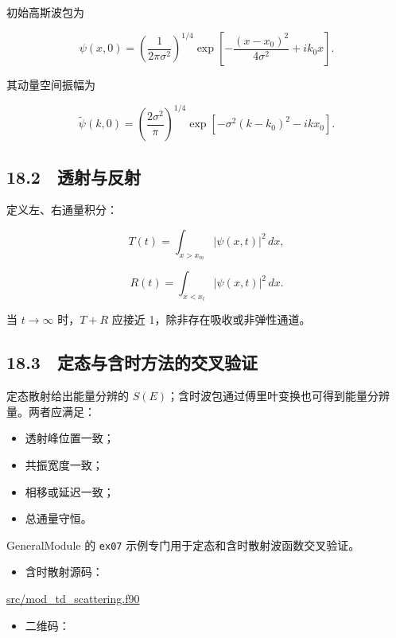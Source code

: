 \documentclass[
  a4paper,
]{ctexbook}
\providecommand{\tightlist}{%
  \setlength{\itemsep}{0pt}\setlength{\parskip}{0pt}}
\begin{document}
初始高斯波包为

\[
\psi(x,0)
=
\left(\frac{1}{2\pi\sigma^2}\right)^{1/4}
\exp\left[
-\frac{(x-x_0)^2}{4\sigma^2}
+ik_0x
\right].
\]

其动量空间振幅为

\[
\tilde\psi(k,0)
=
\left(\frac{2\sigma^2}{\pi}\right)^{1/4}
\exp\left[
-\sigma^2(k-k_0)^2
-ikx_0
\right].
\]

\hypertarget{ux900fux5c04ux4e0eux53cdux5c04}{%
\subsection{18.2　透射与反射}\label{ux900fux5c04ux4e0eux53cdux5c04}}

定义左、右通量积分：

\[
T(t)
=
\int_{x>x_m}|\psi(x,t)|^2\,dx,
\]

\[
R(t)
=
\int_{x<x_l}|\psi(x,t)|^2\,dx.
\]

当 \(t\rightarrow\infty\) 时，\(T+R\) 应接近
1，除非存在吸收或非弹性通道。

\hypertarget{ux5b9aux6001ux4e0eux542bux65f6ux65b9ux6cd5ux7684ux4ea4ux53c9ux9a8cux8bc1}{%
\subsection{18.3　定态与含时方法的交叉验证}\label{ux5b9aux6001ux4e0eux542bux65f6ux65b9ux6cd5ux7684ux4ea4ux53c9ux9a8cux8bc1}}

定态散射给出能量分辨的
\(S(E)\)；含时波包通过傅里叶变换也可得到能量分辨量。两者应满足：

\begin{itemize}
\tightlist
\item
  透射峰位置一致；
\item
  共振宽度一致；
\item
  相移或延迟一致；
\item
  总通量守恒。
\end{itemize}

GeneralModule 的 \texttt{ex07}
示例专门用于定态和含时散射波函数交叉验证。

\begin{itemize}
\tightlist
\item
  含时散射源码：
\end{itemize}

\href{https://github.com/l1Ha/QuantumGeneralModule/blob/main/src/mod_td_scattering.f90}{src/mod\_td\_scattering.f90}

\begin{itemize}
\tightlist
\item
  二维码：
\end{itemize}
\end{document}
